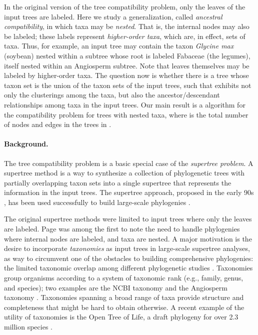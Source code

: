 \documentclass[11pt]{article}
\theoremstyle{definition}
\begin{document}
In the original version of the tree compatibility problem, only the leaves of the input trees are labeled. 
Here we study a generalization, called \emph{ancestral compatibility}, in which taxa may be \emph{nested}.  That is, the internal nodes may also be labeled; these labels represent \emph{higher-order taxa}, which are, in effect, sets of taxa.  Thus, for example,   an input tree may contain the taxon \emph{Glycine max} (soybean) nested within a subtree whose root is labeled Fabaceae (the legumes), itself nested within an Angiosperm subtree.  Note that leaves themselves may be labeled by higher-order taxa.  The question now is whether there is a tree   whose taxon set is the union of the taxon sets of the input trees, such that  exhibits not only the clusterings among the taxa, but also the ancestor/descendant relationships among taxa in the input trees.  Our main result is a  algorithm for the compatibility problem for trees with nested taxa, where  is the total number of nodes and edges in the trees in .

\vspace{-1.5\parsep}

\paragraph{Background.}  The tree compatibility problem is a basic special case of the \emph{supertree problem}.
A supertree method is a way to synthesize a collection of phylogenetic trees with partially overlapping taxon sets into a single supertree that represents the information in the input trees.  The supertree approach, proposed
in the early 90s \cite{Baum:1992,Ragan:1992}, has been used successfully to build large-scale phylogenies \cite{BinindaEmonds:Nature:07}. 

The original supertree methods were limited to input trees where only the leaves are labeled.
Page \cite{Page2004} was among the first to note the need to handle phylogenies where internal nodes are labeled, and taxa are nested.  A major motivation is the desire to incorporate \emph{taxonomies} as input trees in large-scale supertree analyses, as way to circumvent one of the obstacles to building comprehensive phylogenies: the limited taxonomic overlap among different phylogenetic studies \cite{Sanderson:2008}. Taxonomies group organisms according to a system of taxonomic rank  (e.g., family, genus, and species); two examples are the NCBI taxonomy \cite{NCBI2009} and the Angiosperm taxonomy \cite{APG2016}.  Taxonomies spanning a broad range of taxa provide structure and completeness that might be hard to obtain otherwise.    
A recent example of the utility of taxonomies is the Open Tree of Life, a draft phylogeny for over 2.3 million species \cite{HinchliffPNAS2015}.
\end{document}
